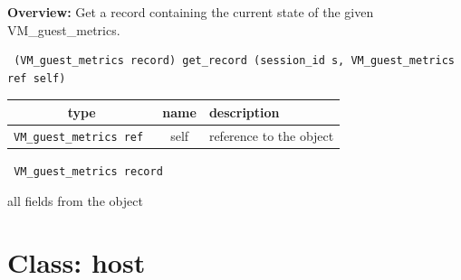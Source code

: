 {\bf Overview:} 
Get a record containing the current state of the given VM\_guest\_metrics.

\begin{verbatim} (VM_guest_metrics record) get_record (session_id s, VM_guest_metrics ref self)\end{verbatim}



 
\vspace{0.3cm}
\begin{tabular}{|c|c|p{7cm}|}
 \hline
{\bf type} & {\bf name} & {\bf description} \\ \hline
{\tt VM\_guest\_metrics ref } & self & reference to the object \\ \hline 

\end{tabular}

\vspace{0.3cm}

{\tt 
VM\_guest\_metrics record
}


all fields from the object
\vspace{0.3cm}
\vspace{0.3cm}
\vspace{0.3cm}

\vspace{1cm}
\newpage
\section{Class: host}
